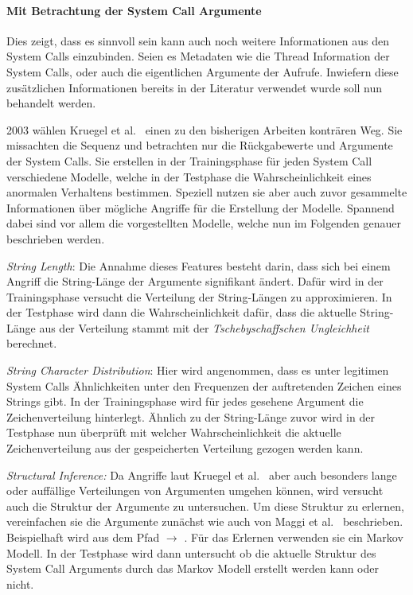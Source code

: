     \paragraph{Mit Betrachtung der System Call Argumente}\label{sec:related_sys_arg}
        Dies zeigt, dass es sinnvoll sein kann auch noch weitere Informationen aus den System Calls einzubinden.
        Seien es Metadaten wie die Thread Information der System Calls, oder auch die eigentlichen Argumente der Aufrufe.
        Inwiefern diese zusätzlichen Informationen bereits in der Literatur verwendet wurde soll nun behandelt werden.

        2003 wählen Kruegel et al.~\cite{ARGUMENTS} einen zu den bisherigen Arbeiten konträren Weg.
        Sie missachten die Sequenz und betrachten nur die Rückgabewerte und Argumente der System Calls.
        Sie erstellen in der Trainingsphase für jeden System Call verschiedene Modelle, welche in der Testphase die Wahrscheinlichkeit eines anormalen Verhaltens bestimmen.
        Speziell nutzen sie aber auch zuvor gesammelte Informationen über mögliche Angriffe für die Erstellung der Modelle.
        Spannend dabei sind vor allem die vorgestellten Modelle, welche nun im Folgenden genauer beschrieben werden.

        \textit{String Length}: Die Annahme dieses Features besteht darin, dass sich bei einem Angriff die String-Länge der Argumente signifikant ändert.
        Dafür wird in der Trainingsphase versucht die Verteilung der String-Längen zu approximieren.
        In der Testphase wird dann die Wahrscheinlichkeit dafür, dass die aktuelle String-Länge aus der Verteilung stammt mit der \textit{Tschebyschaffschen Ungleichheit} berechnet.
        
        \textit{String Character Distribution}: Hier wird angenommen, dass es unter legitimen System Calls Ähnlichkeiten unter den Frequenzen der auftretenden Zeichen eines Strings gibt.
        In der Trainingsphase wird für jedes gesehene Argument die Zeichenverteilung hinterlegt.
        Ähnlich zu der String-Länge zuvor wird in der Testphase nun überprüft mit welcher Wahrscheinlichkeit die aktuelle Zeichenverteilung aus der gespeicherten Verteilung gezogen werden kann.

        \textit{Structural Inference:} Da Angriffe laut Kruegel et al.~\cite{ARGUMENTS} aber auch besonders lange oder auffällige Verteilungen von Argumenten umgehen können, wird versucht auch die Struktur der Argumente zu untersuchen.
        Um diese Struktur zu erlernen, vereinfachen sie die Argumente zunächst wie auch von Maggi et al.~\cite{ARGUMENTS2} beschrieben.
        Beispielhaft wird aus dem Pfad  $\longrightarrow$ .
        Für das Erlernen verwenden sie ein Markov Modell.
        In der Testphase wird dann untersucht ob die aktuelle Struktur des System Call Arguments durch das Markov Modell erstellt werden kann oder nicht.

